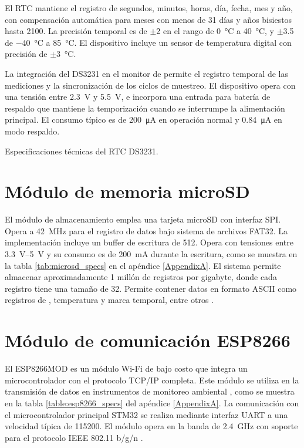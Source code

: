 El RTC mantiene el registro de segundos, minutos, horas, día, fecha, mes y año, con compensación automática para meses con menos de 31 días y años bisiestos hasta 2100. La precisión temporal es de $\pm$\SI{2}{\ppm} en el rango de \SI{0}{\celsius} a \SI{40}{\celsius}, y $\pm$\SI{3.5}{\ppm} de \SI{-40}{\celsius} a \SI{85}{\celsius}. El dispositivo incluye un sensor de temperatura digital con precisión de $\pm$\SI{3}{\celsius}.

La integración del DS3231 en el monitor de \MPF permite el registro temporal de las mediciones y la sincronización de los ciclos de muestreo. El dispositivo opera con una tensión entre \SI{2.3}{\volt} y \SI{5.5}{\volt}, e incorpora una entrada para batería de respaldo que mantiene la temporización cuando se interrumpe la alimentación principal. El consumo típico es de \SI{200}{\micro\ampere} en operación normal y \SI{0.84}{\micro\ampere} en modo respaldo.

\begin{table}[h!]
	\centering
	\caption{Especificaciones técnicas del RTC DS3231.}
	\label{tab:ds3231_specs}
	\small
    
\end{table}

\section{Módulo de memoria microSD}

El módulo de almacenamiento emplea una tarjeta microSD con interfaz SPI. Opera a \SI{42}{\mega\hertz} para el registro  de datos bajo sistema de archivos FAT32. La implementación incluye un buffer de escritura de \SI{512}{\byte}. Opera con tensiones entre \SIrange{3.3}{5}{\volt} y su consumo  es de \SI{200}{\milli\ampere} durante la escritura, como se muestra en la tabla \ref{tab:microsd_specs} en el apéndice \ref{AppendixA}. El sistema permite almacenar aproximadamente 1 millón de registros por gigabyte, donde cada registro tiene una tamaño de  \SI{32}{\byte}. Permite contener datos en formato ASCII como registros de \MPF, temperatura y marca temporal, entre otros \cite{SDCard2020, FatFs2022}.


\section{Módulo de comunicación ESP8266}

El ESP8266MOD es un módulo Wi-Fi de bajo costo que integra un microcontrolador con el protocolo TCP/IP completa. Este módulo se utiliza en la transmisión de datos en instrumentos de monitoreo ambiental \cite{Kodali2017,Maier2017}, como se muestra en la tabla  \ref{table:esp8266_specs} del apéndice \ref{AppendixA}. La comunicación con el microcontrolador principal STM32 se realiza mediante interfaz UART a una velocidad típica de \SI{115200}{\bps}. El módulo opera en la banda de \SI{2.4}{\giga\hertz} con soporte para el protocolo IEEE 802.11 b/g/n \cite{Espressif2020,ESP8266Datasheet}.



